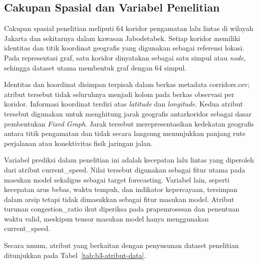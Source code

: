 \subsection{Cakupan Spasial dan Variabel Penelitian}
\label{subsec:cakupan_spasial}

Cakupan spasial penelitian meliputi 64 koridor pengamatan lalu lintas di wilayah Jakarta dan sekitarnya dalam kawasan Jabodetabek. Setiap koridor memiliki identitas dan titik koordinat geografis yang digunakan sebagai referensi lokasi. Pada representasi graf, satu koridor dinyatakan sebagai satu simpul atau \textit{node}, sehingga dataset utama membentuk graf dengan 64 simpul.

Identitas dan koordinat disimpan terpisah dalam berkas metadata \textrm{corridors.csv}; atribut tersebut tidak seluruhnya menjadi kolom pada berkas observasi per koridor. Informasi koordinat terdiri atas \textit{latitude} dan \textit{longitude}. Kedua atribut tersebut digunakan untuk menghitung jarak geografis antarkoridor sebagai dasar pembentukan \textit{Fixed Graph}. Jarak tersebut merepresentasikan kedekatan geografis antara titik pengamatan dan tidak secara langsung menunjukkan panjang rute perjalanan atau konektivitas fisik jaringan jalan.

Variabel prediksi dalam penelitian ini adalah kecepatan lalu lintas yang diperoleh dari atribut \textrm{current\_speed}. Nilai tersebut digunakan sebagai fitur utama pada masukan model sekaligus sebagai target forecasting. Variabel lain, seperti kecepatan arus bebas, waktu tempuh, dan indikator kepercayaan, tersimpan dalam arsip tetapi tidak dimasukkan sebagai fitur masukan model. Atribut turunan \textrm{congestion\_ratio} ikut diperiksa pada prapemrosesan dan penentuan waktu valid, meskipun tensor masukan model hanya menggunakan \textrm{current\_speed}.

Secara umum, atribut yang berkaitan dengan penyusunan dataset penelitian ditunjukkan pada Tabel~\ref{tab:b3-atribut-data}.

